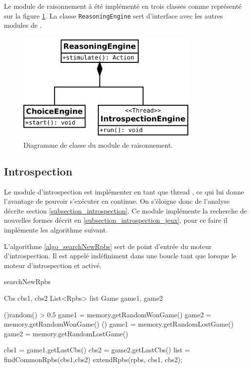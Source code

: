 
Le module de raisonnement à été implémenté en trois classes comme représenté sur la figure \ref{class_diag_reasoning_engine}. La classe \texttt{ReasoningEngine} sert d'interface avec les autres modules de \cogito{}. 

\begin{figure}[H] 
\center
\includegraphics[width=0.8\textwidth]{files/class_diagram/reasoningEngine} 
\caption{Diagramme de classe du module de raisonnement.}
\label{class_diag_reasoning_engine}
\end{figure}

\subsection{Introspection}


Le module d'introspection est implémenter en tant que \og thread \fg{}, ce qui lui donne l'avantage de pouvoir s'exécuter en continue. On s'éloigne donc de l'analyse décrite section \vref{subsection_introspection}. Ce module implémente la recherche de nouvelles formes décrit en \vref{subsection_introspection_jeux}, pour ce faire il implémente les algorithme suivant.


L'algorithme \vref{algo_searchNewRpbs} sert de point d'entrée du moteur d'introspection. Il est appelé indéfiniment dans une boucle \og tant que \fg{} lorsque le moteur d'introspection et activé.


\begin{algorithm}[H]
	\caption{searchNewRpbs}
	\label{algo_searchNewRpbs}
  \vspace{0.2cm}
  
	Cbs cbs1, cbs2\;
	List<Rpbs> list\;	
	Game game1, game2\;
	
	\eIf(){random() > 0.5}
		{
			game1 = memory.getRandomWonGame()\;
			{
				game2 = memory.getRandomWonGame()\;
			}
		}()
		{
			game1 = memory.getRandomLostGame()\;
			{
				game2 = memory.getRandomLostGame()\;
			}
		}
  \vspace{0.2cm}
  
	cbs1 = game1.getLastCbs()\;
	cbs2 = game2.getLastCbs()\;
		{ 
			list = findCommonRpbs(cbs1,cbs2)\;
			{
				extendRpbs(rpbs, cbs1, cbs2);
			}
		}
		
\end{algorithm}

